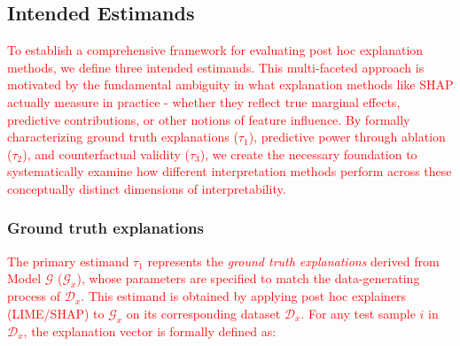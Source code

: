 \subsection{Intended Estimands}
\label{sec:intended estimands}

\textcolor{red}{To establish a comprehensive framework for evaluating post hoc explanation methods, we define three intended estimands. This multi-faceted approach is motivated by the fundamental ambiguity in what explanation methods like SHAP actually measure in practice - whether they reflect true marginal effects, predictive contributions, or other notions of feature influence. By formally characterizing ground truth explanations ($\tau_1$), predictive power through ablation ($\tau_2$), and counterfactual validity ($\tau_3$), we create the necessary foundation to systematically examine how different interpretation methods perform across these conceptually distinct dimensions of interpretability.}

\subsubsection*{Ground truth explanations}
\textcolor{red}{The primary estimand $\tau_1$ represents the \textit{ground truth explanations} derived from Model $\mathcal{G}$ ($\mathcal{G}_x$), whose parameters are specified to match the data-generating process of $\mathcal{D}_x$. This estimand is obtained by applying post hoc explainers (LIME/SHAP) to $\mathcal{G}_x$ on its corresponding dataset $\mathcal{D}_x$. For any test sample $i$ in $\mathcal{D}_x$, the explanation vector is formally defined as:}

